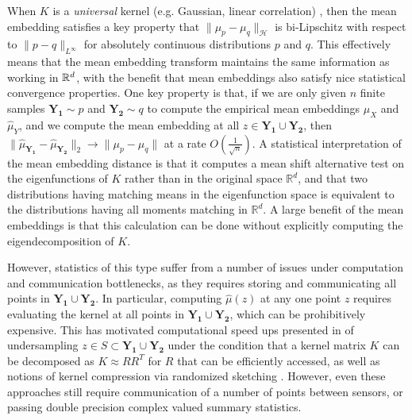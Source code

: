 

When $K$ is a \emph{universal} kernel (e.g. Gaussian, linear correlation) \cite{micchelli2006universal}, then the mean embedding satisfies a key property that $\|\mu_p - \mu_q\|_\mathcal{H}$ %
is bi-Lipschitz with respect to $\|p - q\|_{L^{\infty}}$ for absolutely continuous distributions $p$ and $q$.  This effectively means that the mean embedding transform maintains the same information as working in $\mathbb{R}^d$, with the benefit that mean embeddings also satisfy nice statistical convergence properties.  One key property is that, if we are only given $n$ finite samples $\mathbf{Y_1}\sim p$ and $\mathbf{Y_2}\sim q$ to compute the empirical mean embeddings $\widehat{\mu}_X$ and $\widehat{\mu}_Y$, and we compute the mean embedding at all $z\in \mathbf{Y_1}\cup \mathbf{Y_2}$, then $\|\widehat{\mu}_\mathbf{Y_1} - \widehat{\mu}_\mathbf{Y_2}\|_2 \rightarrow \|\mu_p - \mu_q\|$ at a rate $O\left(\frac{1}{\sqrt{n}}\right)$.  A statistical interpretation of the mean embedding distance is that  it computes a mean shift alternative test on the eigenfunctions of $K$ rather than in the original space $\mathbb{R}^d$, and that two distributions having matching means in the eigenfunction space is equivalent to the distributions having all moments matching in $\mathbb{R}^d$.  A large benefit of the mean embeddings is that this calculation can be done without explicitly computing the eigendecomposition of $K$.


However, statistics of this type suffer from a number of issues under computation and communication bottlenecks, as they requires storing and communicating all points in $\mathbf{Y_1}\cup \mathbf{Y_2}$.  In particular, computing $\hat{\mu}(z)$ at any one point $z$ requires evaluating the kernel at all points in $\mathbf{Y_1}\cup \mathbf{Y_2}$, which can be prohibitively expensive.
This has motivated computational speed ups presented in \cite{cheng2017two} of undersampling $z\in S\subset \mathbf{Y_1}\cup \mathbf{Y_2}$ under the condition that a kernel matrix $K$ can be decomposed as $K\approx RR^T$ for $R$ that can be efficiently accessed, as well as notions of kernel compression via randomized sketching \cite{gribonval2017compressive}.  However, even these approaches still require communication of a number of points between sensors, or passing double precision complex valued summary statistics.  


